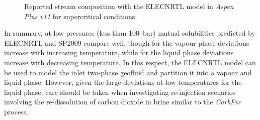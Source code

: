     \begin{figure}[H]
        \centering
        \caption{Reported stream composition with the ELECNRTL model in \emph{Aspen Plus v11} for supercritical conditions}
        \label{fig:SP2009vsAspen_supcritCO2}
    \end{figure}

    In summary, at low pressures (less than \qty{100}{\bar}) mutual solubilities predicted by ELECNRTL and \ac{SP2009} compare well, though for the vapour phase deviations increase with increasing temperature, while for the liquid phase deviations increase with decreasing temperature. In this respect, the ELECNRTL model can be used to model the inlet two-phase geofluid and partition it into a vapour and liquid phase. However, given the large deviations at low temperatures for the liquid phase, care should be taken when investigating re-injection scenarios involving the re-dissolution of carbon dioxide in brine similar to the \emph{CarbFix} process. 

